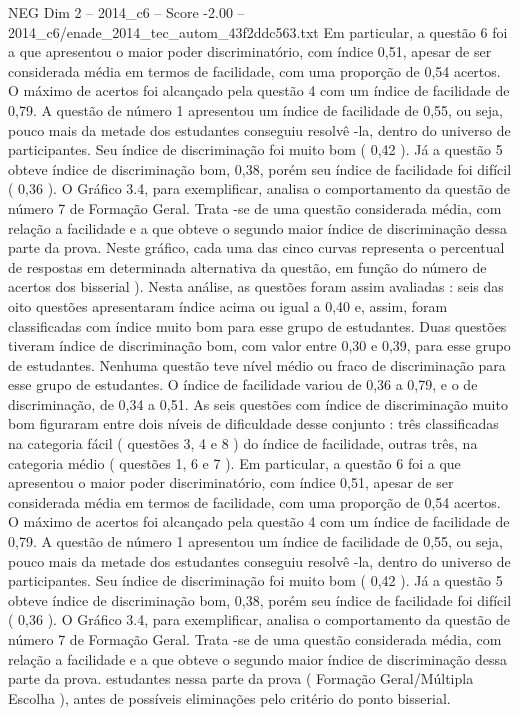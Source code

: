\begin{textsample}{NEG Dim 2 – 2014\_c6 – Score -2.00 – 2014\_c6/enade\_2014\_tec\_autom\_43f2ddc563.txt}
Em particular, a questão 6 foi a que apresentou o maior poder discriminatório, com índice 0,51, apesar de ser considerada média em termos de facilidade, com uma proporção de 0,54 acertos.
O máximo de acertos foi alcançado pela questão 4 com um índice de facilidade de 0,79.
A questão de número 1 apresentou um índice de facilidade de 0,55, ou seja, pouco mais da metade dos estudantes conseguiu resolvê -la, dentro do universo de participantes.
Seu índice de discriminação foi muito bom ( 0,42 ).
Já a questão 5 obteve índice de discriminação bom, 0,38, porém seu índice de facilidade foi difícil ( 0,36 ).
O Gráfico 3.4, para exemplificar, analisa o comportamento da questão de número 7 de Formação Geral.
Trata -se de uma questão considerada média, com relação a facilidade e a que obteve o segundo maior índice de discriminação dessa parte da prova.
Neste gráfico, cada uma das cinco curvas representa o percentual de respostas em determinada alternativa da questão, em função do número de acertos dos bisserial ).
Nesta análise, as questões foram assim avaliadas : seis das oito questões apresentaram índice acima ou igual a 0,40 e, assim, foram classificadas com índice muito bom para esse grupo de estudantes.
Duas questões tiveram índice de discriminação bom, com valor entre 0,30 e 0,39, para esse grupo de estudantes.
Nenhuma questão teve nível médio ou fraco de discriminação para esse grupo de estudantes.
O índice de facilidade variou de 0,36 a 0,79, e o de discriminação, de 0,34 a 0,51.
As seis questões com índice de discriminação muito bom figuraram entre dois níveis de dificuldade desse conjunto : três classificadas na categoria fácil ( questões 3, 4 e 8 ) do índice de facilidade, outras três, na categoria médio ( questões 1, 6 e 7 ).
Em particular, a questão 6 foi a que apresentou o maior poder discriminatório, com índice 0,51, apesar de ser considerada média em termos de facilidade, com uma proporção de 0,54 acertos.
O máximo de acertos foi alcançado pela questão 4 com um índice de facilidade de 0,79.
A questão de número 1 apresentou um índice de facilidade de 0,55, ou seja, pouco mais da metade dos estudantes conseguiu resolvê -la, dentro do universo de participantes.
Seu índice de discriminação foi muito bom ( 0,42 ).
Já a questão 5 obteve índice de discriminação bom, 0,38, porém seu índice de facilidade foi difícil ( 0,36 ).
O Gráfico 3.4, para exemplificar, analisa o comportamento da questão de número 7 de Formação Geral.
Trata -se de uma questão considerada média, com relação a facilidade e a que obteve o segundo maior índice de discriminação dessa parte da prova. estudantes nessa parte da prova ( Formação Geral/Múltipla Escolha ), antes de possíveis eliminações pelo critério do ponto bisserial.

\end{textsample}
